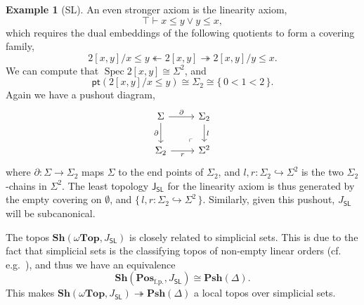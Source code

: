 \documentclass[12pt]{amsart}
\theoremstyle{definition}
\newtheorem{example}[theorem]{Example}
\newcommand{\mb}[1]{\mathbf{#1}}
\newcommand{\mr}[1]{\mathrm{#1}}
\newcommand{\ms}[1]{\mathsf{#1}}
\newcommand{\Pos}{\mb{Pos}}
\newcommand{\sh}{\mb{Sh}}
\newcommand{\psh}{\mb{Psh}}
\newcommand{\set}[1]{\{\,#1\,\}}
\newcommand{\surj}{\twoheadrightarrow}
\newcommand{\hook}{\hookrightarrow}
\newcommand{\fp}{_{\mr{f.p.}}}
\newcommand{\emp}{\emptyset}
\newcommand{\pt}{\ms{pt}}
\newcommand{\wTop}{\omega\mb{Top}}
\newcommand{\spec}{\operatorname{Spec}}
\begin{document}
\begin{example}[SL]
  An even stronger axiom is the linearity axiom, 
  \[ \top \vdash x \le y \vee y \le x, \]
  which requires the dual embeddings of the following quotients to form a covering family,
  \[ 2[x,y]/x \le y \twoheadleftarrow 2[x,y] \surj 2[x,y]/y \le x. \]
  We can compute that $\spec 2[x,y] \cong \Sigma^2$, and 
  \[ \pt(2[x,y]/x \le y) \cong \Sigma_2 \cong \set{0 < 1 < 2}. \]
  Again we have a pushout diagram,
  \[
  \begin{tikzcd}
    \Sigma \ar[r, "\partial"] \ar[d, "\partial"'] & \Sigma_2 \ar[d, "l"] \\ 
    \Sigma_2 \ar[r, "r"'] & \Sigma^2
    \arrow["\lrcorner"{anchor=center, pos=0.125, rotate=180}, draw=none, from=2-2, to=1-1]
  \end{tikzcd}
  \]
  where $\partial : \Sigma \to \Sigma_2$ maps $\Sigma$ to the end points of $\Sigma_2$, and $l,r : \Sigma_2 \hook \Sigma^2$ is the two $\Sigma_2$-chains in $\Sigma^2$. The least topology $\ms J_{\ms{SL}}$ for the linearity axiom is thus generated by the empty covering on $\emp$, and $\set{l,r : \Sigma_2 \hook \Sigma^2}$. Similarly, given this pushout, $J_{\ms{SL}}$ will be subcanonical.

  The topos $\sh(\wTop,J_{\ms{SL}})$ is closely related to simplicial sets. This is due to the fact that simplicial sets is the classifying topos of non-empty linear orders (cf. e.g.~\cite[VIII. 8]{maclane2012sheaves}), and thus we have an equivalence 
  \[ \sh(\Pos\fp,J_{\ms{SL}}) \cong \psh(\Delta). \]
  This makes $\sh(\wTop,J_{\ms{SL}}) \surj \psh(\Delta)$ a local topos over simplicial sets.
\end{example}
\end{document}
